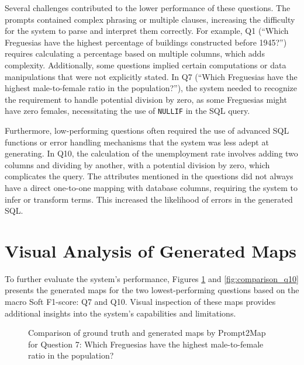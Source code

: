 Several challenges contributed to the lower performance of these questions. The prompts contained complex phrasing or multiple clauses, increasing the difficulty for the system to parse and interpret them correctly. For example, Q1 (“Which Freguesias have the highest percentage of buildings constructed before 1945?”) requires calculating a percentage based on multiple columns, which adds complexity. Additionally, some questions implied certain computations or data manipulations that were not explicitly stated. In Q7 (“Which Freguesias have the highest male-to-female ratio in the population?”), the system needed to recognize the requirement to handle potential division by zero, as some Freguesias might have zero females, necessitating the use of \texttt{NULLIF} in the SQL query.

Furthermore, low-performing questions often required the use of advanced SQL functions or error handling mechanisms that the system was less adept at generating. In Q10, the calculation of the unemployment rate involves adding two columns and dividing by another, with a potential division by zero, which complicates the query. The attributes mentioned in the questions did not always have a direct one-to-one mapping with database columns, requiring the system to infer or transform terms. This increased the likelihood of errors in the generated SQL.


\section{Visual Analysis of Generated Maps}

To further evaluate the system's performance, Figures \ref{fig:comparison_q7} and \ref{fig:comparison_q10} presents the generated maps for the two lowest-performing questions based on the macro Soft F1-score: Q7 and Q10. Visual inspection of these maps provides additional insights into the system's capabilities and limitations.

\begin{figure}[htbp]
    \centering

    \begin{minipage}[b]{\textwidth}
      \centering
      \hfill
      \hfill
    \end{minipage}
    \caption{Comparison of ground truth and generated maps by Prompt2Map for Question 7: Which Freguesias have the highest male-to-female ratio in the population?}
    \label{fig:comparison_q7}
  \end{figure}




